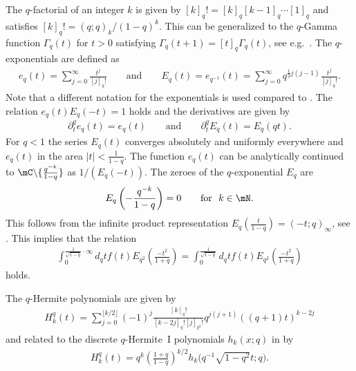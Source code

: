 The $q$-factorial of an integer $k$ is given by $[k]_q!=[k]_q[k-1]_q\cdots [1]_q$ and satisf\/ies $[k]_q!=(q;q)_k/(1-q)^k$. This can be generalized to the $q$-Gamma function $\Gamma_q(t)$ for $t>0$ satisfying $\Gamma_q(t+1)=[t]_q\Gamma_q(t)$, see e.g.~\cite[formula (1.10.1)]{MR1052153}. The $q$-exponentials are def\/ined as
\begin{gather*}
e_q(t)=\sum_{j=0}^\infty\frac{t^j}{[j]_q!} \qquad \mbox{and} \qquad E_q(t)=e_{q^{-1}}(t)=\sum_{j=0}^\infty q^{\frac{1}{2}j(j-1)}\frac{t^j}{[j]_q!}.
\end{gather*}
Note that a dif\/ferent notation for the exponentials is used compared to \cite{MR2595267}. The relation $e_q(t)E_q(-t)=1$ holds and the derivatives are given by
\begin{gather}
\label{aflexp}
\partial_t^qe_q(t)=e_q(t) \qquad \mbox{and}\qquad \partial_t^qE_q(t)=E_q(qt).
\end{gather}
For $q<1$ the series $E_q(t)$ converges absolutely and uniformly everywhere and $e_q(t)$ in the area $|t|<\frac{1}{1-q}$. The function $e_q(t)$ can be analytically continued to $\mC\backslash \{\frac{q^{-k}}{1-q}\}$ as $1/(E_q(-t))$. The zeroes of the $q$-exponential $E_q$ are
\begin{gather}
\label{zeroes}
E_{q}\left(-\frac{q^{-k}}{1-q}\right) = 0\qquad \mbox{for} \ \ k\in\mN.
\end{gather}
This follows from the inf\/inite product representation $E_q(\frac{t}{1-q})=(-t;q)_\infty$, see \cite[formula (1.3.16)]{MR1052153}. This implies that the relation
\begin{gather}
\label{intinfeind}
\int_0^{\frac{1}{\sqrt{1-q}}\cdot\infty}d_qt f(t) E_{q^2}\left(\frac{-t^2}{1+q}\right)=\int_0^{\frac{1}{\sqrt{1-q}}}d_qt f(t) E_{q^2}\left(\frac{-t^2}{1+q}\right)
\end{gather}
holds.



The $q$-Hermite polynomials are given by
\begin{gather}
\label{Hermite}
H_k^q(t) = \sum_{j=0}^{\lfloor k/2\rfloor}(-1)^j\frac{[k]_q!}{[k-2j]_q![j]_{q^2}!}q^{j(j+1)}((q+1)t)^{k-2j}
\end{gather}
and related to the discrete $q$-Hermite~I polynomials $h_k(x;q)$ in \cite[Section~3.28]{Koekoek}  by
\begin{gather*}
H_k^q(t) = q^k\left(\frac{1+q}{1-q}\right)^{k/2}h_k\Big(q^{-1}\sqrt{1-q^2}t;q\Big).
\end{gather*}


